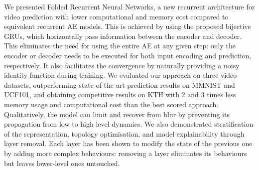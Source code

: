 \documentclass[runningheads]{llncs}
\begin{document}
We presented Folded Recurrent Neural Networks, a new recurrent architecture for video prediction with lower computational and memory cost compared to equivalent recurrent AE models. This is achieved by using the proposed bijective GRUs, which horizontally pass information between the encoder and decoder. This eliminates the need for using the entire AE at any given step: only the encoder or decoder needs to be executed for both input encoding and prediction, respectively. It also facilitates the convergence by naturally providing a noisy identity function during training. We evaluated our approach on three video datasets, outperforming state of the art prediction results on MMNIST and UCF101, and obtaining competitive results on KTH with 2 and 3 times less memory usage and computational cost than the best scored approach. Qualitatively, the model can limit and recover from blur by preventing its propagation from low to high level dynamics. We also demonstrated stratification of the representation, topology optimisation, and model explainability through layer removal. Each layer has been shown to modify the state of the previous one by adding more complex behaviours: removing a layer eliminates its behaviours but leaves lower-level ones untouched.

\clearpage



\end{document}
